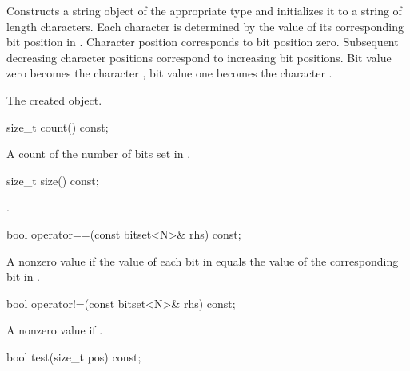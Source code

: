 \begin{itemdescr}
\pnum
\effects
Constructs a string object of the appropriate type
and initializes it to a string of length  characters.
Each character is determined by the value of its corresponding bit position in
.
Character position  corresponds to bit position zero.
Subsequent decreasing character positions correspond to increasing bit
positions.
Bit value zero becomes the character ,
bit value one becomes the character
.

\pnum
\returns
The created object.
\end{itemdescr}

%
\begin{itemdecl}
size_t count() const;
\end{itemdecl}

\begin{itemdescr}
\pnum
\returns
A count of the number of bits set in
.
\end{itemdescr}

%
\begin{itemdecl}
size_t size() const;
\end{itemdecl}

\begin{itemdescr}
\pnum
\returns
{}.
\end{itemdescr}

%
\begin{itemdecl}
bool operator==(const bitset<N>& rhs) const;
\end{itemdecl}

\begin{itemdescr}
\pnum
\returns
A nonzero value if the value of each bit in
equals the value of the corresponding bit in .
\end{itemdescr}

%
\begin{itemdecl}
bool operator!=(const bitset<N>& rhs) const;
\end{itemdecl}

\begin{itemdescr}
\pnum
\returns
A nonzero value if
.
\end{itemdescr}

%
\begin{itemdecl}
bool test(size_t pos) const;
\end{itemdecl}

